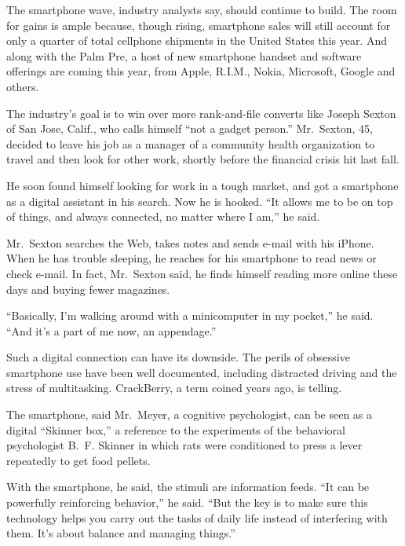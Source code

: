 \documentclass[12pt,a4paper,onecolumn]{article}
\begin{document}
The smartphone wave, industry analysts say, should continue to build. The room for gains is ample
because, though rising, smartphone sales will still account for only a quarter of total cellphone
shipments in the United States this year. And along with the Palm Pre, a host of new smartphone
handset and software offerings are coming this year, from Apple, R.I.M., Nokia, Microsoft, Google
and others.

The industry's goal is to win over more rank-and-file converts like Joseph Sexton of San Jose,
Calif., who calls himself ``not a gadget person.'' Mr.~Sexton, 45, decided to leave his job as a
manager of a community health organization to travel and then look for other work, shortly before
the financial crisis hit last fall.

He soon found himself looking for work in a tough market, and got a smartphone as a digital
assistant in his search. Now he is hooked. ``It allows me to be on top of things, and always
connected, no matter where I am,'' he said.

Mr.~Sexton searches the Web, takes notes and sends e-mail with his iPhone. When he has trouble
sleeping, he reaches for his smartphone to read news or check e-mail. In fact, Mr.~Sexton said, he
finds himself reading more online these days and buying fewer magazines.

``Basically, I'm walking around with a minicomputer in my pocket,'' he said. ``And it's a part of me
now, an appendage.''

Such a digital connection can have its downside. The perils of obsessive smartphone use have been
well documented, including distracted driving and the stress of multitasking. CrackBerry, a term
coined years ago, is telling.

The smartphone, said Mr.~Meyer, a cognitive psychologist, can be seen as a digital ``Skinner box,''
a reference to the experiments of the behavioral psychologist B.~F. Skinner in which rats were
conditioned to press a lever repeatedly to get food pellets.

With the smartphone, he said, the stimuli are information feeds. ``It can be powerfully reinforcing
behavior,'' he said. ``But the key is to make sure this technology helps you carry out the tasks of
daily life instead of interfering with them. It's about balance and managing things.''
\end{document}
